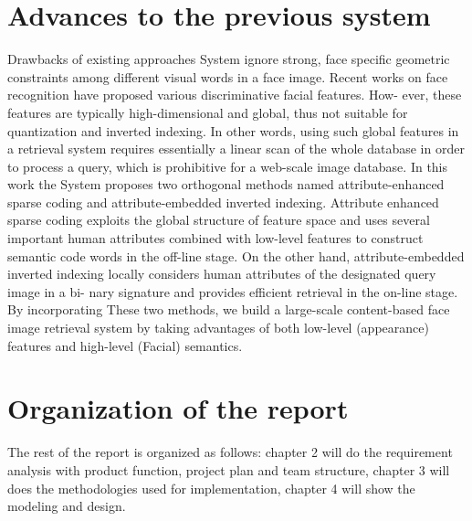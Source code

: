 \section{\normalsize{\textbf{Advances to the previous system}}}
Drawbacks of existing approaches System ignore strong, face specific geometric constraints among different visual words in a face image. Recent works on face recognition have proposed various discriminative facial features. How- ever, these features are typically high-dimensional and global, thus not suitable for quantization and inverted indexing. In other words, using such global features in a retrieval system requires essentially a linear scan of the whole database in order to process a query, which is prohibitive for a web-scale image database.
\newline 
In this work the System proposes two orthogonal methods named attribute-enhanced sparse coding and attribute-embedded inverted indexing. Attribute enhanced sparse coding exploits the global structure of feature space and uses several important human attributes combined with low-level features to construct semantic code words in the off-line stage. On the other hand, attribute-embedded inverted indexing locally considers human attributes of the designated query image in a bi- nary signature and provides efficient retrieval in the on-line stage. By incorporating These two methods, we build a large-scale content-based face image retrieval system by taking advantages of both low-level (appearance) features and high-level (Facial) semantics.

\section{\normalsize{\textbf{Organization of the report}}}
The rest of the report is organized as follows: chapter 2 will do the requirement analysis with product function, project plan and team structure, chapter 3 will does the methodologies used for implementation, chapter 4 will show the modeling and design.

